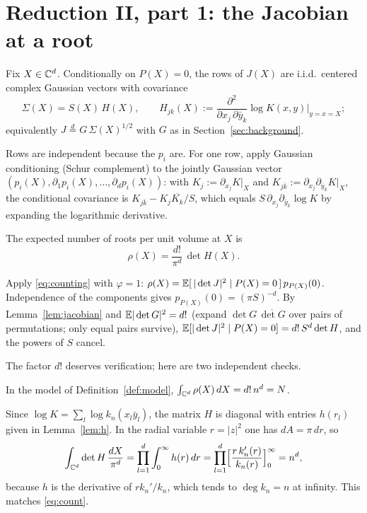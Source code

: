 \section{Reduction II, part 1: the Jacobian at a root}\label{sec:jacobian}

\begin{lemma}\label{lem:jacobian}
  Fix $X\in\mathbb{C}^d$. Conditionally on $P(X)=0$, the rows of $J(X)$ are i.i.d.\ centered complex
  Gaussian vectors with covariance
  \[
    \Sigma(X) = S(X)\,H(X), \qquad
    H_{jk}(X) := \frac{\partial^2}{\partial x_j\,\partial\bar y_k}
    \log K(x,y)\Big|_{y=x=X};
  \]
  equivalently $J \overset{d}{=} G\,\Sigma(X)^{1/2}$ with $G$ as in
  Section~\ref{sec:background}.
\end{lemma}

\proof
Rows are independent because the $p_i$ are. For one row, apply Gaussian conditioning (Schur
complement) to the jointly Gaussian vector $(p_i(X),\partial_1p_i(X),\dots,\partial_dp_i(X))$:
with $K_j := \partial_{x_j}K|_X$ and $K_{j\bar k} := \partial_{x_j}\partial_{\bar y_k}K|_X$,
the conditional covariance is $K_{j\bar k} - K_j\overline{K_k}/S$, which equals
$S\,\partial_{x_j}\partial_{\bar y_k}\log K$ by expanding the logarithmic derivative.
\endproof

\begin{lemma}\label{lem:intensity}
  The expected number of roots per unit volume at $X$ is
  \[
    \rho(X) = \frac{d!}{\pi^d}\,\det H(X).
  \]
\end{lemma}

\proof
Apply \eqref{eq:counting} with $\varphi=1$:
$\rho(X) = \mathbb{E}[\,|\det J|^2 \mid P(X)=0\,]\,p_{P(X)}(0)$. Independence of the components gives
$p_{P(X)}(0) = (\pi S)^{-d}$. By Lemma~\ref{lem:jacobian} and $\mathbb{E}|\det G|^2 = d!$ (expand
$\det G\,\overline{\det G}$ over pairs of permutations; only equal pairs survive),
$\mathbb{E}[|\det J|^2 \mid P(X)=0] = d!\,S^d\det H$, and the powers of $S$ cancel.
\endproof

The factor $d!$ deserves verification; here are two independent checks.

\begin{proposition}\label{prop:masscheck}
  In the model of Definition~\ref{def:model}, $\int_{\mathbb{C}^d}\rho(X)\,dX = d!\,n^d = N$.
\end{proposition}

\proof
Since $\log K = \sum_l\log k_n(x_l\bar y_l)$, the matrix $H$ is diagonal with entries
$h(r_l)$ given in Lemma~\ref{lem:h}. In the radial variable $r=|z|^2$ one has $dA=\pi\,dr$,
so
\[
  \int_{\mathbb{C}^d}\det H\,\frac{dX}{\pi^d}
  = \prod_{l=1}^d\int_0^\infty h(r)\,dr
  = \prod_{l=1}^d\Bigl[\frac{r\,k_n'(r)}{k_n(r)}\Bigr]_0^\infty = n^d,
\]
because $h$ is the derivative of $rk_n'/k_n$, which tends to $\deg k_n = n$ at infinity. This
matches \eqref{eq:count}.
\endproof

